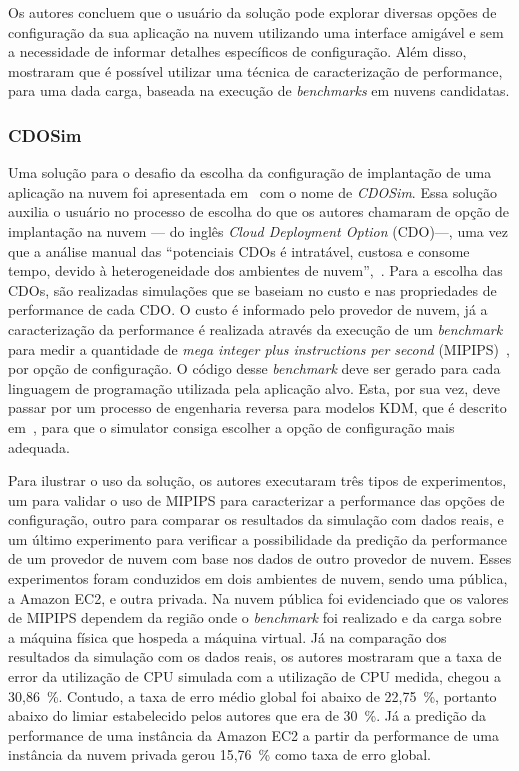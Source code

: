 Os autores concluem que o usuário da solução pode explorar diversas opções de configuração da sua aplicação na nuvem utilizando uma interface amigável e sem a necessidade de informar detalhes específicos de configuração. Além disso, mostraram que é possível utilizar uma técnica de caracterização de performance, para uma dada carga, baseada na execução de {\em benchmarks} em nuvens candidatas.

\subsubsection{CDOSim}\label{subsec:CDOSim}
Uma solução para o desafio da escolha da configuração de implantação de uma aplicação na nuvem foi apresentada em~\cite{fittkau2012cdosim} com o nome de \textit{CDOSim}. Essa solução auxilia o usuário no processo de escolha do que os autores chamaram de opção de implantação na nuvem --- do inglês \textit{Cloud Deployment Option} (CDO)---, uma vez que a análise manual das ``potenciais CDOs é intratável, custosa e consome tempo, devido à heterogeneidade dos ambientes de nuvem'',~\cite{fittkau2012cdosim}. Para a escolha das CDOs, são realizadas simulações que se baseiam no custo e nas propriedades de performance de cada CDO. O custo é informado pelo provedor de nuvem, já a caracterização da performance é realizada através da execução de um \textit{benchmark} para medir a quantidade de \textit{mega integer plus instructions per second} (MIPIPS)~\cite{fittkau2012cdosim}, por opção de configuração. O código desse \textit{benchmark} deve ser gerado para cada linguagem de programação utilizada pela aplicação alvo. Esta, por sua vez, deve passar por um processo de engenharia reversa para modelos KDM, que é descrito em~\cite{perez2011knowledge}, para que o simulator consiga escolher a opção de configuração mais adequada.

Para ilustrar o uso da solução, os autores executaram três tipos de experimentos, um para validar o uso de MIPIPS para caracterizar a performance das opções de configuração, outro para comparar os resultados da simulação com dados reais, e um último experimento para verificar a possibilidade da predição da performance de um provedor de nuvem com base nos dados de outro provedor de nuvem. Esses experimentos foram conduzidos em dois ambientes de nuvem, sendo uma pública, a Amazon EC2, e outra privada. Na nuvem pública foi evidenciado que os valores de MIPIPS dependem da região onde o \textit{benchmark} foi realizado e da carga sobre a máquina física que hospeda a máquina virtual. Já na comparação dos resultados da simulação com os dados reais, os autores mostraram que a taxa de error da utilização de CPU simulada com a utilização de CPU medida, chegou a 30,86~\%. Contudo, a taxa de erro médio global foi abaixo de 22,75~\%, portanto abaixo do limiar estabelecido pelos autores que era de 30~\%. Já a predição da performance de uma instância da Amazon EC2 a partir da performance de uma instância da nuvem privada gerou 15,76~\% como taxa de erro global.


